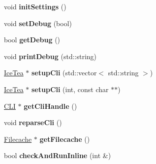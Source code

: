 \begin{DoxyCompactItemize}
\item 
void {\bfseries init\+Settings} ()\hypertarget{class_ice_tea_a03d7b6bd70c2f8d56b01a6454fc9dbef}{}\label{class_ice_tea_a03d7b6bd70c2f8d56b01a6454fc9dbef}

\item 
void {\bfseries set\+Debug} (bool)\hypertarget{class_ice_tea_a23171874a5a7daf67b818dcb3355bc3b}{}\label{class_ice_tea_a23171874a5a7daf67b818dcb3355bc3b}

\item 
bool {\bfseries get\+Debug} ()\hypertarget{class_ice_tea_a35589176135e4d2225b2b461464ec8b4}{}\label{class_ice_tea_a35589176135e4d2225b2b461464ec8b4}

\item 
void {\bfseries print\+Debug} (std\+::string)\hypertarget{class_ice_tea_a04e28054a82d8010ae6505053aec2293}{}\label{class_ice_tea_a04e28054a82d8010ae6505053aec2293}

\item 
\hyperlink{class_ice_tea}{Ice\+Tea} $\ast$ {\bfseries setup\+Cli} (std\+::vector$<$ std\+::string $>$)\hypertarget{class_ice_tea_ab4842fac2c1af5b02c8a30b42543a030}{}\label{class_ice_tea_ab4842fac2c1af5b02c8a30b42543a030}

\item 
\hyperlink{class_ice_tea}{Ice\+Tea} $\ast$ {\bfseries setup\+Cli} (int, const char $\ast$$\ast$)\hypertarget{class_ice_tea_aefa7509294e78f7a23df28f0a40af703}{}\label{class_ice_tea_aefa7509294e78f7a23df28f0a40af703}

\item 
\hyperlink{class_c_l_i}{C\+LI} $\ast$ {\bfseries get\+Cli\+Handle} ()\hypertarget{class_ice_tea_acf4a10613c24125b577ca580c6d80d8d}{}\label{class_ice_tea_acf4a10613c24125b577ca580c6d80d8d}

\item 
void {\bfseries reparse\+Cli} ()\hypertarget{class_ice_tea_a6fa119f052546125a49f1fd7b72b8f67}{}\label{class_ice_tea_a6fa119f052546125a49f1fd7b72b8f67}

\item 
\hyperlink{class_filecache}{Filecache} $\ast$ {\bfseries get\+Filecache} ()\hypertarget{class_ice_tea_acd7874af2003190f783ce838f4ec091a}{}\label{class_ice_tea_acd7874af2003190f783ce838f4ec091a}

\item 
bool {\bfseries check\+And\+Run\+Inline} (int \&)\hypertarget{class_ice_tea_a36c08db158f676176ac2b5b623f6189d}{}\label{class_ice_tea_a36c08db158f676176ac2b5b623f6189d}


\end{DoxyCompactItemize}
